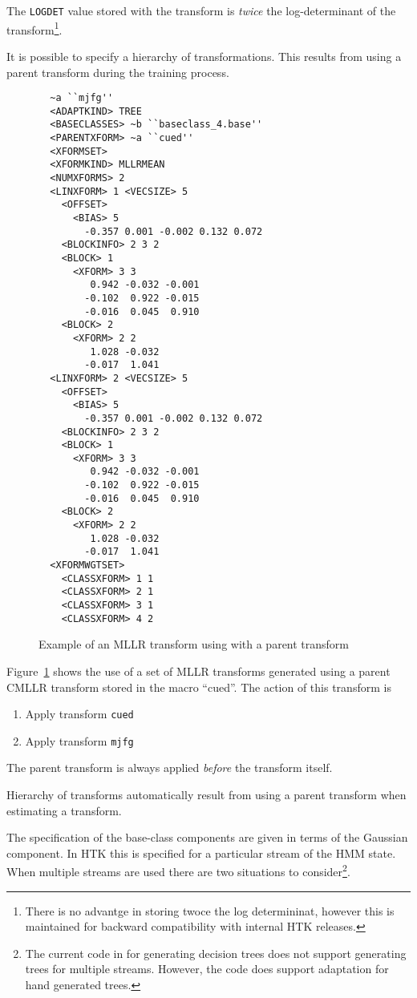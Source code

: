 The {\tt LOGDET} value stored with the transform is {\em twice} the 
log-determinant of the transform\footnote{There is no advantge in storing 
twoce the log determininat, however this is maintained for backward
compatibility with internal HTK releases.}.

It is possible to specify a hierarchy of transformations. This results
from using a parent transform during the training process.
\begin{figure}[htbp]
\begin{verbatim}
  ~a ``mjfg''
  <ADAPTKIND> TREE
  <BASECLASSES> ~b ``baseclass_4.base''
  <PARENTXFORM> ~a ``cued''
  <XFORMSET>  
  <XFORMKIND> MLLRMEAN
  <NUMXFORMS> 2
  <LINXFORM> 1 <VECSIZE> 5
    <OFFSET> 
      <BIAS> 5
        -0.357 0.001 -0.002 0.132 0.072
    <BLOCKINFO> 2 3 2
    <BLOCK> 1
      <XFORM> 3 3
         0.942 -0.032 -0.001
        -0.102  0.922 -0.015
        -0.016  0.045  0.910
    <BLOCK> 2
      <XFORM> 2 2
         1.028 -0.032
        -0.017  1.041 
  <LINXFORM> 2 <VECSIZE> 5
    <OFFSET> 
      <BIAS> 5
        -0.357 0.001 -0.002 0.132 0.072
    <BLOCKINFO> 2 3 2
    <BLOCK> 1
      <XFORM> 3 3
         0.942 -0.032 -0.001
        -0.102  0.922 -0.015
        -0.016  0.045  0.910
    <BLOCK> 2
      <XFORM> 2 2
         1.028 -0.032
        -0.017  1.041 
  <XFORMWGTSET>
    <CLASSXFORM> 1 1
    <CLASSXFORM> 2 1
    <CLASSXFORM> 3 1
    <CLASSXFORM> 4 2
\end{verbatim}
\caption{Example of an MLLR transform using with a parent transform}
\label{fig:hiermllr}
\end{figure}
Figure~\ref{fig:hiermllr} shows the use of a set of MLLR transforms
generated using a parent CMLLR transform stored in the macro ``cued''. The
action of this transform is
\begin{enumerate}
\item Apply transform {\tt cued}
\item Apply transform {\tt mjfg}
\end{enumerate}
The parent transform is always applied {\it before} the transform
itself.

Hierarchy of transforms automatically result from using a parent transform
when estimating a transform. 

The specification of the base-class components are given in terms
of the Gaussian component. In HTK this is specified for a particular
stream of the HMM state. When multiple streams are used there are two 
situations to consider\footnote{The current code in  for 
generating decision trees does not support generating trees for multiple 
streams. However, the code does support adaptation for hand generated 
trees.}.

